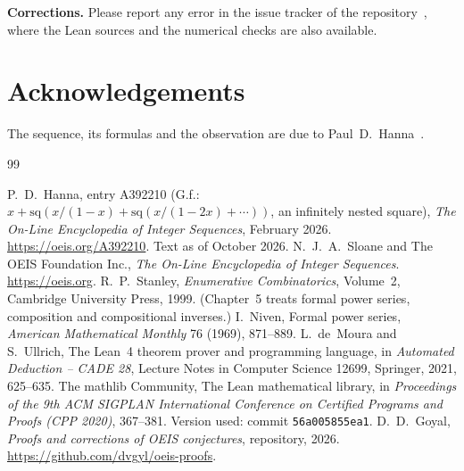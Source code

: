 \documentclass[11pt,a4paper]{article}
\theoremstyle{definition}
\theoremstyle{remark}
\newcommand{\para}[1]{\par\medskip\noindent\textbf{#1}\enspace}
\begin{document}
\para{Corrections.} Please report any error in the issue tracker of the repository~\cite{repo}, where the Lean sources and the numerical checks are also
available.

\section*{Acknowledgements}
The sequence, its formulas and the observation are due to Paul~D.~Hanna~\cite{oeis}.

\begin{thebibliography}{99}\small
\raggedright
{} P.~D.~Hanna, entry A392210 (G.f.: $x+\mathrm{sq}(x/(1-x)+\mathrm{sq}(x/(1-2x)+\cdots))$, an infinitely nested square), \emph{The On-Line Encyclopedia of Integer Sequences}, February 2026. \url{https://oeis.org/A392210}. Text as of October 2026.
 N.~J.~A.~Sloane and The OEIS Foundation Inc., \emph{The On-Line Encyclopedia of Integer Sequences}. \url{https://oeis.org}.
 R.~P.~Stanley, \emph{Enumerative Combinatorics}, Volume~2, Cambridge University Press, 1999. (Chapter~5 treats formal power series, composition and compositional inverses.)
 I.~Niven, Formal power series, \emph{American Mathematical Monthly} 76 (1969), 871--889.
 L.~de~Moura and S.~Ullrich, The Lean~4 theorem prover and programming language, in \emph{Automated Deduction -- CADE 28}, Lecture Notes in Computer Science 12699, Springer, 2021, 625--635.
 The mathlib Community, The Lean mathematical library, in \emph{Proceedings of the 9th ACM SIGPLAN International Conference on Certified Programs and Proofs (CPP 2020)}, 367--381. Version used: commit \texttt{56a005855ea1}.
 D.~D.~Goyal, \emph{Proofs and corrections of OEIS conjectures}, repository, 2026. \url{https://github.com/dvgyl/oeis-proofs}.
\end{thebibliography}
\end{document}
